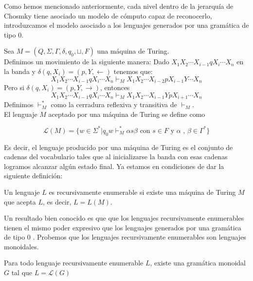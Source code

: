 \documentclass[../main.tex]{subfiles}
\begin{document}
     Como hemos mencionado anteriormente, cada nivel dentro de la jerarquía de Chosmky tiene asociado un modelo de cómputo capaz de reconocerlo, introduzcamos el modelo asociado a los lenguajes generados por una gramática de tipo $0$.
	\begin{dfn}
		Sea $M=(Q, \Sigma, \Gamma, \delta, q_0, \sqcup, F)$ una máquina de Turing.  \\
		Definimos un movimiento de la siguiente manera:
		Dado $X_1 X_2 \cdots X_{i-1} q X_i \cdots X_n$ en la banda y $\delta (q, X_i)=(p,Y,\leftarrow)$ tenemos que:
		\[
			X_1 X_2 \cdots X_{i-1} q X_i \cdots X_n \vdash_M X_1 X_2 \cdots X_{i-2} p X_{i-1} Y \cdots X_n
		\] 
		Pero si $\delta (q, X_i)=(p,Y,\rightarrow)$, entonces 
		\[
		X_1 X_2 \cdots X_{i-1} q X_i \cdots X_n \vdash_M X_1 X_2 \cdots X_{i-1} Y p X_{i+1} \cdots X_n
		\] 
		Definimos $\vdash^*_M$ como la cerradura reflexiva y transitiva de $\vdash_M$. \\
		El lenguaje $M$ aceptado por una máquina de Turing se define como
		
		$$
			\mathcal{L}(M)= \{ w \in \Sigma ^* | q_0w \vdash_M^* \alpha s \beta\text{ con }s\in F \text{ y } \alpha \text{ , } \beta \in \Gamma^*\}
		$$
		 
	\end{dfn}
Es decir, el lenguaje producido por una máquina de Turing es el conjunto de cadenas del vocabulario tales que al inicializarse la banda con esas cadenas logramos alcanzar algún estado final. Ya estamos en condiciones de dar la siguiente definición: 

\begin{dfn}
	Un lenguaje $L$ es recursivamente enumerable si existe una máquina de Turing $M$ que acepta $L$, es decir, $L=L(M)$.
\end{dfn}
	
Un resultado bien conocido es que que los lenguajes recursivamente enumerables tienen el mismo poder expresivo que los lenguajes generados por una gramática de tipo $0$ \cite{hopcroft01}. Probemos que los lenguajes recursivamente enumerables son lenguajes monoidales.  

\begin{prop}

	Para todo lenguaje recursivamente enumerable $L$, existe una gramática monoidal $G$ tal que $L=\mathcal{L}(G)$ 
	
\end{prop}
\end{document}
